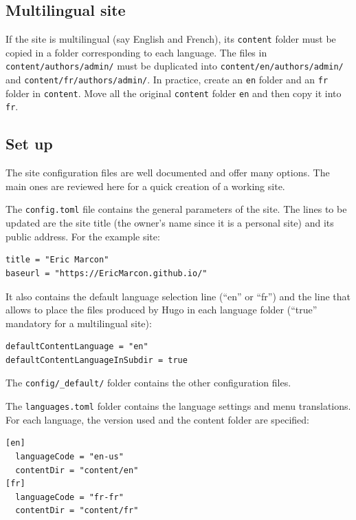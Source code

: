\documentclass[
  12pt,
  american,
  a4paper,
  extrafontsizes,onecolumn,openright
  ]{memoir}
\begin{document}
\subsection{Multilingual site}\label{multilingual-site}

If the site is multilingual (say English and French), its \texttt{content} folder must be copied in a folder corresponding to each language.
The files in \texttt{content/authors/admin/} must be duplicated into \texttt{content/en/authors}\break\texttt{/admin/} and \texttt{content/fr/authors/admin/}.
In practice, create an \texttt{en} folder and an \texttt{fr} folder in \texttt{content}.
Move all the original \texttt{content} folder \texttt{en} and then copy it into \texttt{fr}.

\subsection{Set up}\label{set-up}

The site configuration files are well documented and offer many options.
The main ones are reviewed here for a quick creation of a working site.

The \texttt{config.toml} file contains the general parameters of the site.
The lines to be updated are the site title (the owner's name since it is a personal site) and its public address.
For the example site:

\begin{verbatim}
title = "Eric Marcon"
baseurl = "https://EricMarcon.github.io/"
\end{verbatim}

It also contains the default language selection line (\enquote{en} or \enquote{fr}) and the line that allows to place the files produced by Hugo in each language folder (\enquote{true} mandatory for a multilingual site):

\begin{verbatim}
defaultContentLanguage = "en"
defaultContentLanguageInSubdir = true
\end{verbatim}

The \texttt{config/\_default/} folder contains the other configuration files.

The \texttt{languages.toml} folder contains the language settings and menu translations.
For each language, the version used and the content folder are specified:

\begin{verbatim}
[en]
  languageCode = "en-us"
  contentDir = "content/en"
[fr]
  languageCode = "fr-fr"
  contentDir = "content/fr"
\end{verbatim}
\end{document}
